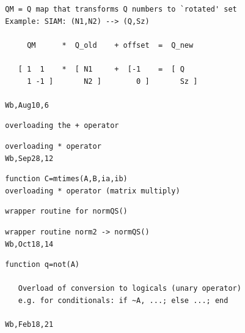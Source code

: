 \documentclass[twoside,12pt]{article}
\begin{document}
\pagebreak[3]



\begin{verbatim}
  QM = Q map that transforms Q numbers to `rotated' set
  Example: SIAM: (N1,N2) --> (Q,Sz)
 
       QM      *  Q_old    + offset  =  Q_new
 
     [ 1  1    *  [ N1     +  [-1    =  [ Q
       1 -1 ]       N2 ]        0 ]       Sz ]
 
  Wb,Aug10,6
\end{verbatim}

\pagebreak[3]



\begin{verbatim}
  overloading the + operator
\end{verbatim}

\pagebreak[3]



\begin{verbatim}
  overloading * operator
  Wb,Sep28,12
\end{verbatim}

\pagebreak[3]



\begin{verbatim}
  function C=mtimes(A,B,ia,ib)
  overloading * operator (matrix multiply)
\end{verbatim}

\pagebreak[3]



\begin{verbatim}
  wrapper routine for normQS()
\end{verbatim}

\pagebreak[3]



\begin{verbatim}
  wrapper routine norm2 -> normQS()
  Wb,Oct18,14
\end{verbatim}

\pagebreak[3]



\begin{verbatim}
  function q=not(A)
 
     Overload of conversion to logicals (unary operator)
     e.g. for conditionals: if ~A, ...; else ...; end
 
  Wb,Feb18,21
\end{verbatim}
\end{document}
